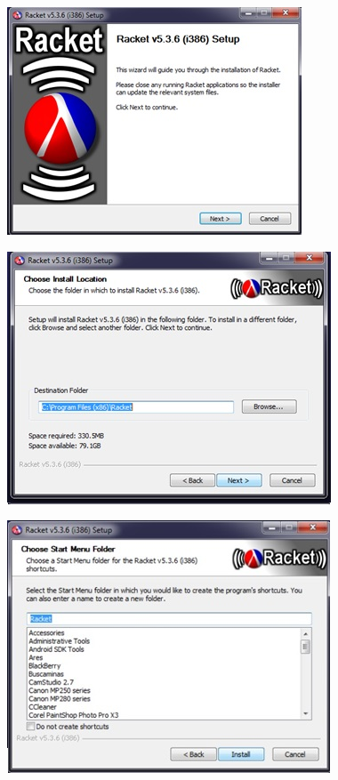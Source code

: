 \documentclass[11pt]{article} %
\begin{document}
\begin{figure}[h]
\centering
    \includegraphics{imagenes_investigacion/paso_uno.jpg}
\caption {}
\label{Figura 1}
\end{figure}

\begin{figure}[h]
\centering
    \includegraphics{imagenes_investigacion/paso_dos.jpg}
\caption { }
\label{Figura 2}
\end{figure}

\begin{figure}[h]
\centering
    \includegraphics{imagenes_investigacion/paso_tres.jpg}
\caption { }
\label{Figura 3}
\end{figure}
\end{document}
